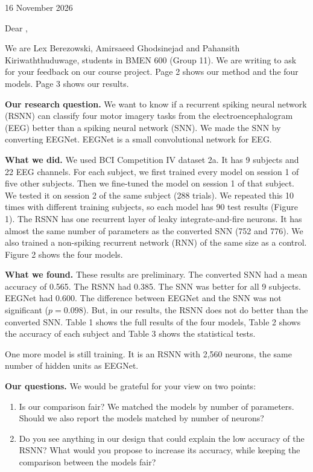 16 November 2026

Dear \Salutation,

We are Lex Berezowski, Amirsaeed Ghodsinejad and Pahansith Kiriwaththuduwage, students in BMEN 600 (Group 11). We
are writing to ask for your feedback on our course project. Page 2 shows our method and the four models. Page 3 shows
our results.

\textbf{Our research question.} We want to know if a recurrent spiking neural network (RSNN) can classify four motor
imagery tasks from the electroencephalogram (EEG) better than a spiking neural network (SNN). We made the SNN by
converting EEGNet. EEGNet is a small convolutional network for EEG.

\textbf{What we did.} We used BCI Competition IV dataset 2a. It has 9 subjects and 22 EEG channels. For each subject,
we first trained every model on session 1 of five other subjects. Then we fine-tuned the model on session 1 of that
subject. We tested it on session 2 of the same subject (288 trials). We repeated this 10 times with different training
subjects, so each model has 90 test results (Figure 1). The RSNN has one recurrent layer of leaky integrate-and-fire
neurons. It has almost the same number of parameters as the converted SNN (752 and 776). We also trained a non-spiking
recurrent network (RNN) of the same size as a control. Figure 2 shows the four models.

\textbf{What we found.} These results are preliminary. The converted SNN had a mean accuracy of 0.565. The RSNN had
0.385. The SNN was better for all 9 subjects. EEGNet had 0.600. The difference
between EEGNet and the SNN was not significant ($p = 0.098$). But, in our results, the RSNN does not do better than the
converted SNN. Table 1 shows the full results of the four models, Table 2 shows the accuracy of each subject and
Table 3 shows the statistical tests.

One more model is still training. It is an RSNN with 2,560 neurons, the same number of hidden units as EEGNet.

\textbf{Our questions.} We would be grateful for your view on two points:
\begin{enumerate}\setlength{\itemsep}{2pt}\setlength{\parskip}{0pt}\setlength{\topsep}{2pt}
  \item Is our comparison fair? We matched the models by number of parameters. Should we also report the models
        matched by number of neurons?
  \item Do you see anything in our design that could explain the low accuracy of the RSNN? What would you propose to
        increase its accuracy, while keeping the comparison between the models fair?
\end{enumerate}

